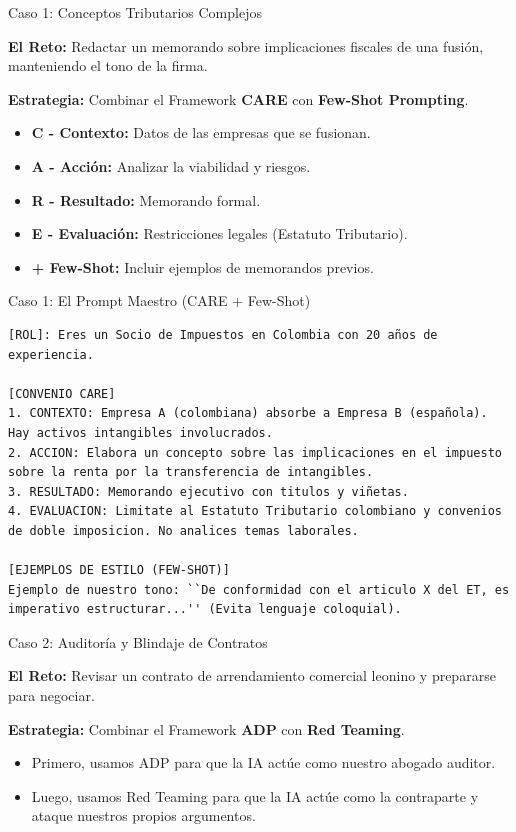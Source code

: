 \documentclass[aspectratio=169]{beamer}
\begin{document}
\begin{frame}[fragile]{Caso 1: Conceptos Tributarios Complejos}


\textbf{El Reto:} Redactar un memorando sobre implicaciones fiscales de una fusión, manteniendo el tono de la firma.

\textbf{Estrategia:} Combinar el Framework \textbf{CARE} con \textbf{Few-Shot Prompting}.

\begin{itemize}
  \item \textbf{C - Contexto:} Datos de las empresas que se fusionan.
  \item \textbf{A - Acción:} Analizar la viabilidad y riesgos.
  \item \textbf{R - Resultado:} Memorando formal.
  \item \textbf{E - Evaluación:} Restricciones legales (Estatuto Tributario).
  \item \textbf{+ Few-Shot:} Incluir ejemplos de memorandos previos.
\end{itemize}
\end{frame}



\begin{frame}[fragile]{Caso 1: El Prompt Maestro (CARE + Few-Shot)}


\begin{lstlisting}[basicstyle=\ttfamily\scriptsize]
[ROL]: Eres un Socio de Impuestos en Colombia con 20 años de experiencia.

[CONVENIO CARE]
1. CONTEXTO: Empresa A (colombiana) absorbe a Empresa B (española). Hay activos intangibles involucrados.
2. ACCION: Elabora un concepto sobre las implicaciones en el impuesto sobre la renta por la transferencia de intangibles.
3. RESULTADO: Memorando ejecutivo con titulos y viñetas.
4. EVALUACION: Limitate al Estatuto Tributario colombiano y convenios de doble imposicion. No analices temas laborales.

[EJEMPLOS DE ESTILO (FEW-SHOT)]
Ejemplo de nuestro tono: ``De conformidad con el articulo X del ET, es imperativo estructurar...'' (Evita lenguaje coloquial).
\end{lstlisting}


\end{frame}



\begin{frame}[fragile]{Caso 2: Auditoría y Blindaje de Contratos}


\textbf{El Reto:} Revisar un contrato de arrendamiento comercial leonino y prepararse para negociar.

\textbf{Estrategia:} Combinar el Framework \textbf{ADP} con \textbf{Red Teaming}.

\begin{itemize}
  \item Primero, usamos ADP para que la IA actúe como nuestro abogado auditor.
  \item Luego, usamos Red Teaming para que la IA actúe como la contraparte y ataque nuestros propios argumentos.
\end{itemize}
\end{frame}
\end{document}
